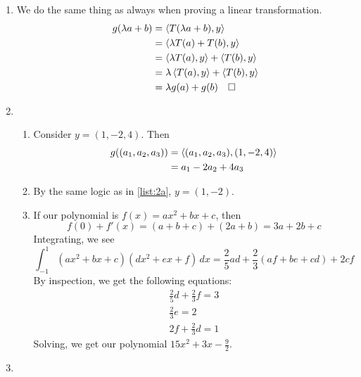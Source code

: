 \documentclass[12pt]{article}
\begin{document}
\begin{enumerate}
      \item We do the same thing as always when proving a linear transformation.
            \begin{align*}
                  g(\lambda a + b) & = \braket{T(\lambda a + b), y}              \\
                                   & = \braket{\lambda T(a)+T(b), y}             \\
                                   & = \braket{\lambda T(a), y}+\braket{T(b), y} \\
                                   & = \lambda \braket{T(a), y}+\braket{T(b), y} \\
                                   & = \lambda g(a)+g(b)\quad\square
            \end{align*}
      \item \begin{enumerate}
                  \item Consider $y=(1, -2, 4)$. \label{list:2a}
                        Then
                        \begin{align*}
                              g((a_1, a_2, a_3)) & = \braket{(a_1, a_2, a_3), (1, -2, 4)} \\
                                                 & = a_1 - 2a_2+4a_3
                        \end{align*}
                  \item By the same logic as in \ref{list:2a}, $y=(1, -2)$.
                  \item If our polynomial is $f(x)=ax^2+bx+c$, then
                        \[f(0)+f'(x)=(a+b+c)+(2a+b)=3a+2b+c\]
                        Integrating, we see
                        \[\int_{-1}^{1} (ax^2+bx+c)(dx^2+ex+f)\,dx = \frac{2}{5}ad+\frac{2}{3}(af+be+cd)+2cf\]
                        By inspection, we get the following equations:
                        \begin{gather*}
                              \frac{2}{5}d+\frac{2}{3}f=3 \\
                              \frac{2}{3}e=2 \\
                              2f+\frac{2}{3}d=1
                        \end{gather*}
                        Solving, we get our polynomial $\boxed{15x^2+3x-\frac{9}{2}}$.
            \end{enumerate}
      \item \begin{enumerate}

\end{enumerate}
\end{enumerate}
\end{document}
